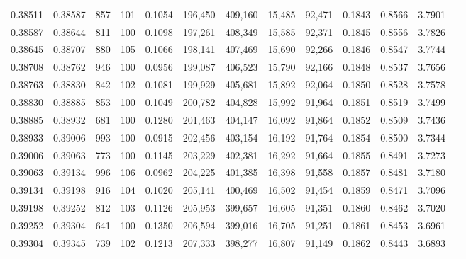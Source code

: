 \begin{tabular}{rrrrrrrrrrrrr}
0.38511 & 0.38587 &   857 & 101 &                                     0.1054 & 196,450 & 409,160 &  15,485 &  92,471 & 0.1843 & 0.8566 & 3.7901 \\
0.38587 & 0.38644 &   811 & 100 &                                     0.1098 & 197,261 & 408,349 &  15,585 &  92,371 & 0.1845 & 0.8556 & 3.7826 \\
0.38645 & 0.38707 &   880 & 105 &                                     0.1066 & 198,141 & 407,469 &  15,690 &  92,266 & 0.1846 & 0.8547 & 3.7744 \\
0.38708 & 0.38762 &   946 & 100 &                                     0.0956 & 199,087 & 406,523 &  15,790 &  92,166 & 0.1848 & 0.8537 & 3.7656 \\
0.38763 & 0.38830 &   842 & 102 &                                     0.1081 & 199,929 & 405,681 &  15,892 &  92,064 & 0.1850 & 0.8528 & 3.7578 \\
0.38830 & 0.38885 &   853 & 100 &                                     0.1049 & 200,782 & 404,828 &  15,992 &  91,964 & 0.1851 & 0.8519 & 3.7499 \\
0.38885 & 0.38932 &   681 & 100 &                                     0.1280 & 201,463 & 404,147 &  16,092 &  91,864 & 0.1852 & 0.8509 & 3.7436 \\
0.38933 & 0.39006 &   993 & 100 &                                     0.0915 & 202,456 & 403,154 &  16,192 &  91,764 & 0.1854 & 0.8500 & 3.7344 \\
0.39006 & 0.39063 &   773 & 100 &                                     0.1145 & 203,229 & 402,381 &  16,292 &  91,664 & 0.1855 & 0.8491 & 3.7273 \\
0.39063 & 0.39134 &   996 & 106 &                                     0.0962 & 204,225 & 401,385 &  16,398 &  91,558 & 0.1857 & 0.8481 & 3.7180 \\
0.39134 & 0.39198 &   916 & 104 &                                     0.1020 & 205,141 & 400,469 &  16,502 &  91,454 & 0.1859 & 0.8471 & 3.7096 \\
0.39198 & 0.39252 &   812 & 103 &                                     0.1126 & 205,953 & 399,657 &  16,605 &  91,351 & 0.1860 & 0.8462 & 3.7020 \\
0.39252 & 0.39304 &   641 & 100 &                                     0.1350 & 206,594 & 399,016 &  16,705 &  91,251 & 0.1861 & 0.8453 & 3.6961 \\
0.39304 & 0.39345 &   739 & 102 &                                     0.1213 & 207,333 & 398,277 &  16,807 &  91,149 & 0.1862 & 0.8443 & 3.6893 \\

\end{tabular}
